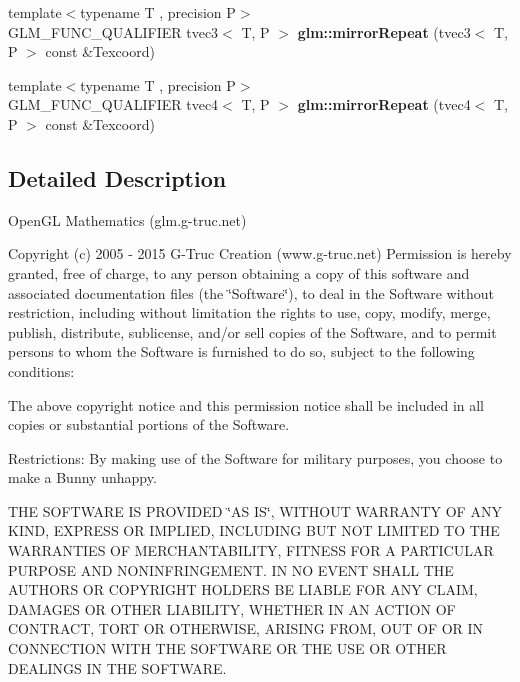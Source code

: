 \begin{DoxyCompactItemize}
\item 
\hypertarget{namespaceglm_a34a384753e18a9ffd563d655acd01ca3}{{\footnotesize template$<$typename T , precision P$>$ }\\G\-L\-M\-\_\-\-F\-U\-N\-C\-\_\-\-Q\-U\-A\-L\-I\-F\-I\-E\-R tvec3$<$ T, P $>$ {\bfseries glm\-::mirror\-Repeat} (tvec3$<$ T, P $>$ const \&Texcoord)}\label{namespaceglm_a34a384753e18a9ffd563d655acd01ca3}

\item 
\hypertarget{namespaceglm_a14141287fb517976eebbc9495bc29693}{{\footnotesize template$<$typename T , precision P$>$ }\\G\-L\-M\-\_\-\-F\-U\-N\-C\-\_\-\-Q\-U\-A\-L\-I\-F\-I\-E\-R tvec4$<$ T, P $>$ {\bfseries glm\-::mirror\-Repeat} (tvec4$<$ T, P $>$ const \&Texcoord)}\label{namespaceglm_a14141287fb517976eebbc9495bc29693}

\end{DoxyCompactItemize}


\subsection{Detailed Description}
Open\-G\-L Mathematics (glm.\-g-\/truc.\-net)

Copyright (c) 2005 -\/ 2015 G-\/\-Truc Creation (www.\-g-\/truc.\-net) Permission is hereby granted, free of charge, to any person obtaining a copy of this software and associated documentation files (the \char`\"{}\-Software\char`\"{}), to deal in the Software without restriction, including without limitation the rights to use, copy, modify, merge, publish, distribute, sublicense, and/or sell copies of the Software, and to permit persons to whom the Software is furnished to do so, subject to the following conditions\-:

The above copyright notice and this permission notice shall be included in all copies or substantial portions of the Software.

Restrictions\-: By making use of the Software for military purposes, you choose to make a Bunny unhappy.

T\-H\-E S\-O\-F\-T\-W\-A\-R\-E I\-S P\-R\-O\-V\-I\-D\-E\-D \char`\"{}\-A\-S I\-S\char`\"{}, W\-I\-T\-H\-O\-U\-T W\-A\-R\-R\-A\-N\-T\-Y O\-F A\-N\-Y K\-I\-N\-D, E\-X\-P\-R\-E\-S\-S O\-R I\-M\-P\-L\-I\-E\-D, I\-N\-C\-L\-U\-D\-I\-N\-G B\-U\-T N\-O\-T L\-I\-M\-I\-T\-E\-D T\-O T\-H\-E W\-A\-R\-R\-A\-N\-T\-I\-E\-S O\-F M\-E\-R\-C\-H\-A\-N\-T\-A\-B\-I\-L\-I\-T\-Y, F\-I\-T\-N\-E\-S\-S F\-O\-R A P\-A\-R\-T\-I\-C\-U\-L\-A\-R P\-U\-R\-P\-O\-S\-E A\-N\-D N\-O\-N\-I\-N\-F\-R\-I\-N\-G\-E\-M\-E\-N\-T. I\-N N\-O E\-V\-E\-N\-T S\-H\-A\-L\-L T\-H\-E A\-U\-T\-H\-O\-R\-S O\-R C\-O\-P\-Y\-R\-I\-G\-H\-T H\-O\-L\-D\-E\-R\-S B\-E L\-I\-A\-B\-L\-E F\-O\-R A\-N\-Y C\-L\-A\-I\-M, D\-A\-M\-A\-G\-E\-S O\-R O\-T\-H\-E\-R L\-I\-A\-B\-I\-L\-I\-T\-Y, W\-H\-E\-T\-H\-E\-R I\-N A\-N A\-C\-T\-I\-O\-N O\-F C\-O\-N\-T\-R\-A\-C\-T, T\-O\-R\-T O\-R O\-T\-H\-E\-R\-W\-I\-S\-E, A\-R\-I\-S\-I\-N\-G F\-R\-O\-M, O\-U\-T O\-F O\-R I\-N C\-O\-N\-N\-E\-C\-T\-I\-O\-N W\-I\-T\-H T\-H\-E S\-O\-F\-T\-W\-A\-R\-E O\-R T\-H\-E U\-S\-E O\-R O\-T\-H\-E\-R D\-E\-A\-L\-I\-N\-G\-S I\-N T\-H\-E S\-O\-F\-T\-W\-A\-R\-E.

